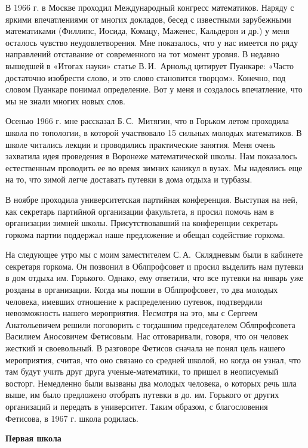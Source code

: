 В 1966 г. в Москве проходил Международный конгресс математиков. Наряду с яркими впечатлениями от многих докладов, бесед с известными зарубежными математиками (Филлипс, Иосида, Комацу, Маженес, Кальдерон и др.) у меня осталось чувство неудовлетворения. Мне показалось, что у нас имеется по ряду направлений отставание от современного на тот момент уровня. В недавно вышедшей в «Итогах науки» статье В.\,И.~Арнольд цитирует Пуанкаре: «Часто достаточно изобрести слово, и это слово становится творцом». Конечно, под словом Пуанкаре понимал определение. Вот у меня и создалось впечатление, что мы не знали многих новых слов.

Осенью 1966 г. мне рассказал Б.\,С.~Митягин, что в Горьком летом проходила школа по топологии, в которой участвовало 15 сильных молодых математиков. В школе читались лекции и проводились практические занятия. Меня очень захватила идея проведения в Воронеже математической школы.
Нам показалось естественным проводить ее во время зимних каникул в вузах. Мы надеялись еще на то, что зимой легче доставать путевки в дома отдыха и турбазы.

В ноябре проходила университетская партийная конференция. Выступая на ней, как секретарь партийной организации факультета, я просил помочь нам в организации зимней школы. Присутствовавший на конференции секретарь горкома партии поддержал наше предложение и обещал содействие горкома.

На следующее утро мы с моим заместителем С.\,А.~Скля\-дневым были в кабинете секретаря горкома.
Он позвонил в Облпрофсовет и просил выделить нам путевки в дом отдыха им. Горького.
Однако, ему ответили, что все путевки на январь уже розданы в организации. Когда мы пошли в Облпрофсовет, то два молодых человека, имевших отношение к распределению путевок, подтвердили невозможность нашего мероприятия. Несмотря на это, мы с Сергеем Анатольевичем решили поговорить с тогдашним председателем Облпрофсовета Василием Аносовичем Фетисовым. Нас отговаривали, говоря, что он человек жесткий и своевольный. В разговоре Фетисов сначала не понял цель нашего мероприятия, считая, что оно связано со средней школой, но когда он
узнал, что там будут учить друг друга ученые-математики, то пришел в неописуемый восторг. Немедленно были вызваны два молодых человека, о которых речь шла выше, им было предложено отобрать путевки в до. им. Горького от других организаций и передать в университет. Таким образом, с благословения Фетисова, в 1967 г. школа родилась.

{\bf Первая школа}

